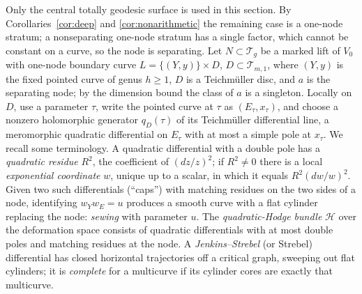 \documentclass[12pt]{article}
\newcommand{\T}{\mathcal T}
\theoremstyle{remark}
\begin{document}
Only the central totally geodesic surface is used in this section.
By Corollaries~\ref{cor:deep} and \ref{cor:nonarithmetic}
the remaining case is a one-node stratum; a nonseparating one-node
stratum has a single factor, which cannot be constant on a curve, so
the node is separating. Let \(N\subset\T_g\) be a marked lift of
\(V_0\) with one-node boundary curve
\(L=\{(Y,y)\}\times D\), \(D\subset\T_{m,1}\),
where \((Y,y)\) is the fixed pointed curve of genus \(h\ge1\),
\(D\) is a Teichm\"uller disc, and \(a\) is the separating node;
by the dimension bound the class of \(a\) is a singleton. Locally on
\(D\), use a parameter \(\tau\), write the pointed curve at \(\tau\)
as \((E_\tau,x_\tau)\), and choose a nonzero holomorphic generator
\(q_D(\tau)\) of its Teichm\"uller differential line, a meromorphic
quadratic differential on \(E_\tau\) with at most a simple pole at
\(x_\tau\). We recall some terminology.
A quadratic differential with a double pole has a \emph{quadratic
residue} \(R^2\), the coefficient of \((dz/z)^2\); if \(R^2\ne0\)
there is a local \emph{exponential coordinate} \(w\), unique up to a
scalar, in which it equals \(R^2(dw/w)^2\). Given two such
differentials (``caps'') with matching residues on the two sides of
a node, identifying \(w_Yw_E=u\) produces a smooth curve with a flat
cylinder replacing the node: \emph{sewing} with parameter \(u\).
The \emph{quadratic-Hodge bundle} \(\mathcal H\) over the
deformation space consists of quadratic differentials with at most
double poles and matching residues at the node. A
\emph{Jenkins--Strebel} (or Strebel) differential has closed
horizontal trajectories off a critical graph, sweeping out flat
cylinders; it is \emph{complete} for a multicurve if its cylinder
cores are exactly that multicurve.
\end{document}
